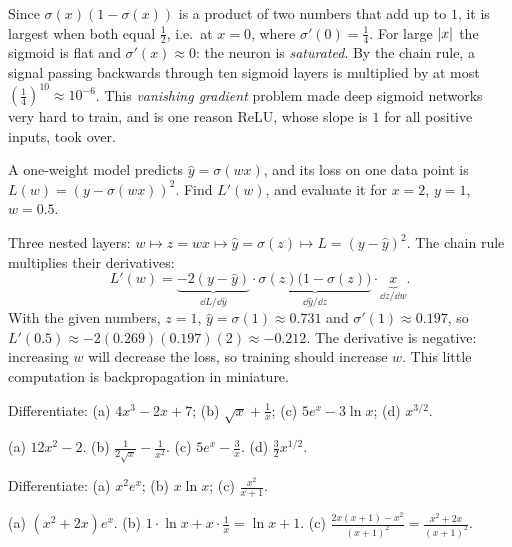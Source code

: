 \begin{mlnote}
Since $\sigma(x)(1 - \sigma(x))$ is a product of two numbers that add up to
$1$, it is largest when both equal $\frac12$, i.e.\ at $x = 0$, where
$\sigma'(0) = \frac14$. For large $\lvert x\rvert$ the sigmoid is flat and
$\sigma'(x)\approx0$: the neuron is \emph{saturated}. By the chain rule, a
signal passing backwards through ten sigmoid layers is multiplied by at most
$\left(\frac14\right)^{10} \approx 10^{-6}$. This \emph{vanishing gradient}
problem made deep sigmoid networks very hard to train, and is one reason
ReLU, whose slope is $1$ for all positive inputs, took over.
\end{mlnote}

\begin{example}\label{ex:tiny-loss-derivative}
A one-weight model predicts $\hat y = \sigma(wx)$, and its loss on one data
point is $L(w) = (y - \sigma(wx))^2$. Find $L'(w)$, and evaluate it for $x = 2$,
$y = 1$, $w = 0.5$.

\sol Three nested layers: $w \mapsto z = wx \mapsto \hat y = \sigma(z) \mapsto
L = (y - \hat y)^2$. The chain rule multiplies their derivatives:
\[
  L'(w) = \underbrace{-2(y - \hat y)}_{\dd L/\dd\hat y}
  \cdot\underbrace{\sigma(z)\bigl(1 - \sigma(z)\bigr)}_{\dd\hat y/\dd z}
  \cdot\underbrace{x}_{\dd z/\dd w}.
\]
With the given numbers, $z = 1$, $\hat y = \sigma(1) \approx 0.731$ and
$\sigma'(1) \approx 0.197$, so $L'(0.5) \approx -2(0.269)(0.197)(2) \approx
-0.212$. The derivative is negative: increasing $w$ will decrease the loss, so
training should increase $w$. This little computation is backpropagation in
miniature.
\end{example}

\sectionexercises

\begin{exercise}
Differentiate: (a) $4x^3 - 2x + 7$; (b) $\sqrt x + \frac1x$;
(c) $5e^x - 3\ln x$; (d) $x^{3/2}$.
\end{exercise}
\begin{solution}
(a) $12x^2 - 2$. (b) $\tfrac{1}{2\sqrt x} - \tfrac{1}{x^2}$.
(c) $5e^x - \tfrac3x$. (d) $\tfrac32x^{1/2}$.
\end{solution}

\begin{exercise}
Differentiate: (a) $x^2e^x$; (b) $x\ln x$; (c) $\frac{x^2}{x + 1}$.
\end{exercise}
\begin{solution}
(a) $(x^2 + 2x)e^x$. (b) $1\cdot\ln x + x\cdot\tfrac1x = \ln x + 1$.
(c) $\tfrac{2x(x + 1) - x^2}{(x + 1)^2} = \tfrac{x^2 + 2x}{(x + 1)^2}$.
\end{solution}

